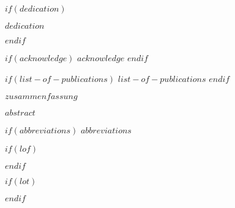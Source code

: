 \documentclass[a4paper,11pt]{article}
\begin{document}
	$if(dedication)$
	\null
	\vspace{5cm}
	\begin{center}
		\textit{$dedication$}
	\end{center}
	\newpage\null\thispagestyle{empty}\newpage
	$endif$
	
	
	$if(acknowledge)$
	\newpage
	$acknowledge$
	$endif$
	\pagestyle{plain}
	\setcounter{page}{1}    %
	\newpage\null\thispagestyle{empty}\newpage
	
	
	$if(list-of-publications)$
	$list-of-publications$
	\newpage\null\thispagestyle{empty}\newpage
	$endif$
	
	
	$zusammenfassung$
	\newpage\null\thispagestyle{empty}\newpage
	
	
	$abstract$
	\newpage\null\thispagestyle{empty}\newpage
	
	\newpage
	\tableofcontents
	\clearpage
	
	$if(abbreviations)$
	\newpage
	$abbreviations$
	
	$if(lof)$
	\listoffigures
	$endif$
	
	$if(lot)$
	\newpage
	\listoftables
	$endif$
	
\end{document}
